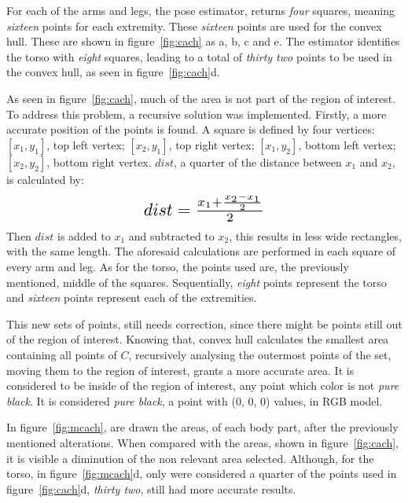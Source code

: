 \documentclass[titlepage,12pt,a4paper,times]{book}
\begin{document}
For each of the arms and legs, the pose estimator, returns \emph{four} squares,
meaning \emph{sixteen} points for each extremity. These \emph{sixteen} points
are used for the convex hull. These are shown in figure~\ref{fig:cach} as a, b,
c and e. The estimator identifies the torso with \emph{eight} squares, leading
to a total of \emph{thirty two} points to be used in the convex hull, as seen
in figure~\ref{fig:cach}d.

As seen in figure~\ref{fig:cach}, much of the area is not part of the region of
interest. To address this problem, a recursive solution was implemented.
Firstly, a more accurate position of the points is found. A square is defined
by four vertices: $[x_1, y_1]$, top left vertex; $[x_2, y_1]$, top right
vertex; $[x_1, y_2]$, bottom left vertex; $[x_2, y_2]$, bottom right vertex.
$dist$, a quarter of the distance between $x_1$ and $x_2$, is calculated by:
\[
\resizebox{.35 \textwidth}{!}
{
$dist = \frac{x_1 + \frac{x_2 - x_1}{2}}{2}$
}
\]
Then $dist$ is added to $x_1$ and subtracted to $x_2$, this results in
less wide rectangles, with the same length. The aforesaid calculations are
performed in each square of every arm and leg. As for the torso, the points
used are, the previously mentioned, middle of the squares. Sequentially,
\emph{eight} points represent the torso and \emph{sixteen} points represent each
of the extremities.

This new sets of points, still needs correction, since there might be points
still out of the region of interest. Knowing that, convex hull calculates the
smallest area containing all points of $C$, recursively analysing the outermost
points of the set, moving them to the region of interest, grants a more
accurate area. It is considered to be inside of the region of interest, any
point which color is not \emph{pure black}. It is considered \emph{pure black},
a point with (0, 0, 0) values, in \ac{RGB} model.

In figure~\ref{fig:mcach}, are drawn the areas, of each body part, after the
previously mentioned alterations. When compared with the areas, shown in
figure~\ref{fig:cach}, it is visible a diminution of the non relevant area
selected. Although, for the torso, in figure~\ref{fig:mcach}d, only were
considered a quarter of the points used in figure~\ref{fig:cach}d, \emph{thirty
two}, still had more accurate results.
\end{document}
